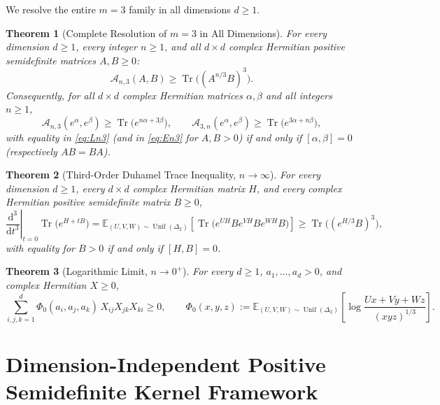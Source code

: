 \documentclass[11pt,a4paper]{article}
\newtheorem{theorem}{Theorem}[section]
\theoremstyle{remark}
\newcommand{\Tr}{\operatorname{Tr}}
\begin{document}
We resolve the entire $m=3$ family in all dimensions $d\ge 1$.

\begin{theorem}[Complete Resolution of $m=3$ in All Dimensions]\label{thm:all_n}
For every dimension $d\ge 1$, every integer $n\ge 1$, and all $d\times d$ complex Hermitian positive semidefinite matrices $A,B\ge 0$:
\begin{equation}\label{eq:En3}
  \mathcal{A}_{n,3}(A,B) \ge \Tr\!\big((A^{n/3}B)^3\big).
\end{equation}
Consequently, for all $d\times d$ complex Hermitian matrices $\alpha,\beta$ and all integers $n\ge 1$,
\begin{equation}\label{eq:Ln3}
  \mathcal{A}_{n,3}(e^\alpha,e^\beta) \ge \Tr\!\big(e^{n\alpha+3\beta}\big), \qquad
  \mathcal{A}_{3,n}(e^\alpha,e^\beta) \ge \Tr\!\big(e^{3\alpha+n\beta}\big),
\end{equation}
with equality in \eqref{eq:Ln3} (and in \eqref{eq:En3} for $A,B>0$) if and only if $[\alpha,\beta]=0$ (respectively $AB=BA$).
\end{theorem}

\begin{theorem}[Third-Order Duhamel Trace Inequality, $n\to\infty$]\label{thm:duhamel}
For every dimension $d\ge 1$, every $d\times d$ complex Hermitian matrix $H$, and every complex Hermitian positive semidefinite matrix $B\ge 0$,
\begin{equation}\label{eq:duhamel}
  \left.\frac{\mathrm{d}^3}{\mathrm{d}t^3}\right|_{t=0}\Tr\!\big(e^{H+tB}\big)
  = \mathbb{E}_{(U,V,W)\sim\operatorname{Unif}(\Delta_2)}\!\left[\Tr\!\big(e^{UH}Be^{VH}Be^{WH}B\big)\right]
  \ge \Tr\!\big((e^{H/3}B)^3\big),
\end{equation}
with equality for $B>0$ if and only if $[H,B]=0$.
\end{theorem}

\begin{theorem}[Logarithmic Limit, $n\to 0^+$]\label{thm:phi0}
For every $d\ge 1$, $a_1,\dots,a_d>0$, and complex Hermitian $X\ge 0$,
\[
\sum_{i,j,k=1}^d \Phi_0(a_i,a_j,a_k)\,X_{ij}X_{jk}X_{ki} \ge 0, \qquad
\Phi_0(x,y,z) := \mathbb{E}_{(U,V,W)\sim\operatorname{Unif}(\Delta_2)}\!\left[\log\frac{Ux+Vy+Wz}{(xyz)^{1/3}}\right].
\]
\end{theorem}

\section{Dimension-Independent Positive Semidefinite Kernel Framework}
\end{document}
